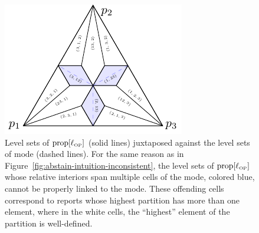 \documentclass[11pt]{article}
\newcommand{\prop}[1]{\mathrm{prop}[#1]}
\newcommand{\LWW}{L_{\text{\tiny WW}}}
\newcommand{\ellOP}{\ell_{\text{\tiny OP}}}
\newcommand{\mode}{\mathrm{mode}}
\begin{document}
\begin{figure}[t]
	\begin{minipage}{0.47\linewidth}
		\centering
		\includegraphics[width=0.9\linewidth]{tikz/ordered-partition}
	\end{minipage}
	\hfill
	\begin{minipage}{0.5\linewidth}
		\caption{Level sets of $\prop{\ellOP}$ (solid lines)
			juxtaposed against the level sets of $\mode$ (dashed lines).
      For the same reason as in Figure~\ref{fig:abstain-intuition-inconsistent}, the level sets of $\prop{\ellOP}$ whose relative interiors span multiple cells of the mode, colored blue, cannot be properly linked to the mode.
      These offending cells correspond to reports whose highest partition has more than one element, where in the white cells, the ``highest'' element of the partition is well-defined.}
		\label{fig:ordered-partition}
	\end{minipage}
\end{figure}
\end{document}
